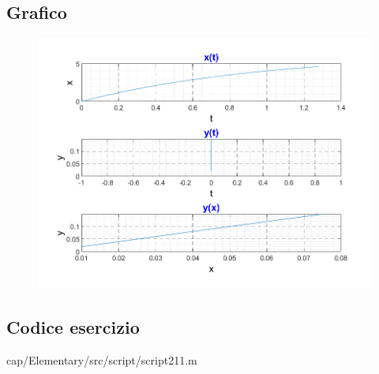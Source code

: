\subsection{Grafico}
\begin{figure}[h]
    \centering
    \includegraphics{cap/Elementary/img/script211}
    \label{fig:script211}
\end{figure}

\subsection{Codice esercizio}

{cap/Elementary/src/script/script211.m}
